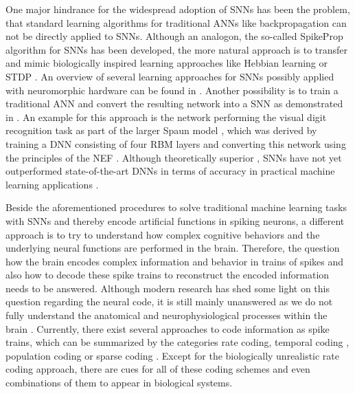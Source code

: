 One major hindrance for the widespread adoption of \acp{SNN} has been the problem, that standard learning algorithms for traditional \acp{ANN} like backpropagation \parencite{Werbos1974} can not be directly applied to \acp{SNN}.
Although an analogon, the so-called SpikeProp algorithm \parencite{Bohte2002} for \acp{SNN} has been developed, the more natural approach is to transfer and mimic biologically inspired learning approaches like Hebbian learning \parencite{Hebb1949} or \ac{STDP} \parencite{Bi2001}.
An overview of several learning approaches for \acp{SNN} possibly applied with neuromorphic hardware can be found in \textcite{Walter2015}.
Another possibility is to train a traditional \ac{ANN} and convert the resulting network into a \ac{SNN} as demonstrated in \textcites{Diehl2015, Hunsberger2015}.
An example for this approach is the network performing the visual digit recognition task as part of the larger \ac{Spaun} model \parencite{Eliasmith2012}, which was derived by training a \ac{DNN} consisting of four \ac{RBM} layers and converting this network using the principles of the \ac{NEF} \parencite{Eliasmith2003}.
Although theoretically superior \parencite{Maass1997}, \acp{SNN} have not yet outperformed state-of-the-art \acp{DNN} in terms of accuracy in practical machine learning applications \parencite{Schmidhuber2015}.

Beside the aforementioned procedures to solve traditional machine learning tasks with \acp{SNN} and thereby encode artificial functions in spiking neurons, a different approach is to try to understand how complex cognitive behaviors and the underlying neural functions are performed in the brain.
Therefore, the question how the brain encodes complex information and behavior in trains of spikes and also how to decode these spike trains to reconstruct the encoded information needs to be answered.
Although modern research has shed some light on this question regarding the neural code, it is still mainly unanswered as we do not fully understand the anatomical and neurophysiological processes within the brain \parencite{Stanley2013}.
Currently, there exist several approaches to code information as spike trains, which can be summarized by the categories rate coding, temporal coding \parencite[Chap. 7.6]{Gerstner2014}, population coding \parencites[Chap. 1]{Gerstner2002}{Ponulak2011}{Boerlin2011} or sparse coding \parencite{Olshausen1996}.
Except for the biologically unrealistic rate coding approach, there are cues for all of these coding schemes and even combinations \parencite{Gupta2014} of them to appear in biological systems.

